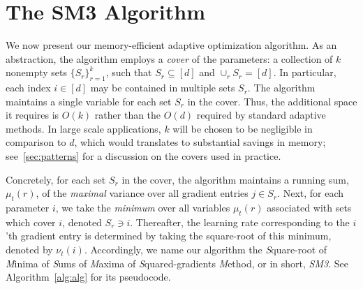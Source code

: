 \documentclass[a4paper,11pt]{article}
\newcommand{\set}[1]{\{#1\}}
\let\nablaold\nabla
\renewcommand{\nabla}{\nablaold\mkern-1mu}
\def\NAME{SM3\xspace}
\newcommand{\mx}[1]{\mu_{#1}}
\newcommand{\mi}[1]{\nu_{#1}}
\begin{document}
\section{The \NAME Algorithm}
\label{sec:algo}

We now present our memory-efficient adaptive optimization algorithm. As an
abstraction, the algorithm employs a \emph{cover} of the parameters: a
collection of $k$ nonempty sets $\set{S_r}_{r=1}^k$, such that
$S_r\subseteq[d]$ and $\cup_r S_r = [d]$. In particular, each index $i\in[d]$
may be contained in multiple sets $S_r$. The algorithm maintains a single
variable for each set $S_r$ in the cover. Thus, the additional space it
requires is $O(k)$ rather than the $O(d)$ required by standard adaptive
methods. In large scale applications, $k$ will be chosen to be negligible in
comparison to $d$, which would translates to substantial savings in memory;
see~\cref{sec:patterns} for a discussion on the covers used in practice.

Concretely, for each set $S_r$ in the cover, the algorithm maintains a running
sum, $\mx{t}(r)$, of the \emph{maximal} variance over all gradient entries $j
\in S_r$. Next, for each parameter $i$, we take the \emph{minimum} over all
variables $\mx{t}(r)$ associated with sets which cover $i$, denoted $S_r \ni i$.
Thereafter, the learning rate corresponding to the $i$'th gradient entry is
determined by taking the square-root of this minimum, denoted by $\mi{t}(i)$.
Accordingly, we name our algorithm the \emph{S}quare-root of \emph{M}inima of
\emph{S}ums of \emph{M}axima of \emph{S}quared-gradients \emph{M}ethod, or in
short, \emph{\NAME}. See Algorithm~\cref{alg:alg} for its pseudocode.

\end{document}
